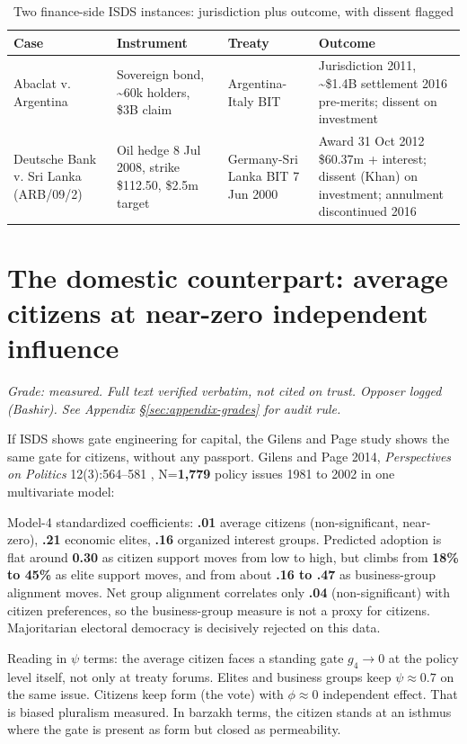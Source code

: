 \begin{table}[h]
\centering
\small
\caption{Two finance-side ISDS instances: jurisdiction plus outcome, with dissent flagged}
\label{tab:isds-pair}
\begin{tabular}{p{2.6cm}p{2.6cm}p{2.6cm}p{2.2cm}}
\toprule
Case & Instrument & Treaty & Outcome \\
\midrule
Abaclat v. Argentina & Sovereign bond, \~{}60k holders, \$3B claim & Argentina-Italy BIT & Jurisdiction 2011, \~{}\$1.4B settlement 2016 pre-merits; dissent on investment \\
Deutsche Bank v. Sri Lanka (ARB/09/2) & Oil hedge 8 Jul 2008, strike \$112.50, \$2.5m target & Germany-Sri Lanka BIT 7 Jun 2000 & Award 31 Oct 2012 \$60.37m + interest; dissent (Khan) on investment; annulment discontinued 2016 \\
\bottomrule
\end{tabular}
\end{table}

\section{The domestic counterpart: average citizens at near-zero independent influence}

\textit{Grade: measured. Full text verified verbatim, not cited on trust. Opposer logged (Bashir). See Appendix \S\ref{sec:appendix-grades} for audit rule.}

If ISDS shows gate engineering for capital, the Gilens and Page study shows the same gate for citizens, without any passport. Gilens and Page 2014, \textit{Perspectives on Politics} 12(3):564--581 \cite{gilens2014}, N=\textbf{1,779} policy issues 1981 to 2002 in one multivariate model:

Model-4 standardized coefficients: \textbf{.01} average citizens (non-significant, near-zero), \textbf{.21} economic elites, \textbf{.16} organized interest groups. Predicted adoption is flat around \textbf{0.30} as citizen support moves from low to high, but climbs from \textbf{18\% to 45\%} as elite support moves, and from about \textbf{.16 to .47} as business-group alignment moves. Net group alignment correlates only \textbf{.04} (non-significant) with citizen preferences, so the business-group measure is not a proxy for citizens. Majoritarian electoral democracy is decisively rejected on this data.

Reading in $\psi$ terms: the average citizen faces a standing gate $g_4 \to 0$ at the policy level itself, not only at treaty forums. Elites and business groups keep $\psi \approx 0.7$ on the same issue. Citizens keep form (the vote) with $\phi \approx 0$ independent effect. That is biased pluralism measured. In barzakh terms, the citizen stands at an isthmus where the gate is present as form but closed as permeability.

